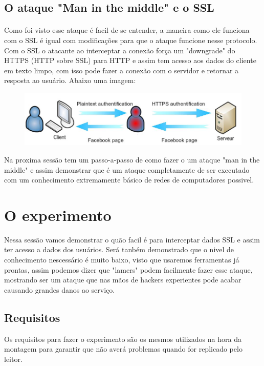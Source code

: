\documentclass{article}
\begin{document}
  \subsection{O ataque "Man in the middle" e o SSL}
  \paragraph{}
  Como foi visto esse ataque é facil de se entender, a maneira como ele
  funciona com o SSL é igual com modificações para que o ataque funcione nesse
  protocolo. Com o SSL o atacante ao interceptar a conexão força um "downgrade"
  do HTTPS (HTTP sobre SSL) para HTTP e assim tem acesso aos dados do cliente
  em texto limpo, com isso pode fazer a conexão com o servidor e retornar a
  resposta ao usuário. Abaixo uma imagem:

  \begin{figure}[h!]
		\includegraphics[width=\textwidth]{httpsManInTheMiddle.png}
		\label{fig:httpsManInTheMiddle}
	\end{figure}

    Na proxima sessão tem um passo-a-passo de como fazer o um ataque
  "man in the middle" e assim demonstrar que é um ataque completamente de
  ser executado com um conhecimento extremamente básico de redes de computadores
  possivel.

  \newpage

  \section{O experimento}
    Nessa sessão vamos demonstrar o quão facil é para interceptar dados SSL e
  assim ter acesso a dados dos usuários. Será tanbém demonstrado que o nivel de
  conhecimento nescessário é muito baixo, visto que usaremos ferramentas já prontas,
  assim podemos dizer que "lamers" podem facilmente fazer esse ataque, mostrando
  ser um ataque que nas mãos de hackers experientes pode acabar causando grandes
  danos ao serviço.

  \subsection{Requisitos}
    Os requisitos para fazer o experimento são os mesmos utilizados na hora
  da montagem para garantir que não averá problemas quando for replicado pelo
  leitor.
\end{document}
